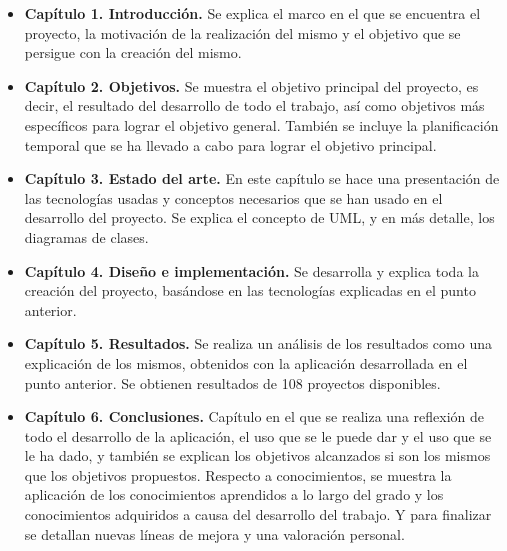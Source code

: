 \documentclass[a4paper, 12pt]{book}
\begin{document}
\begin{itemize}
  \item \textbf{Capítulo 1. Introducción.} Se explica el marco en el que se encuentra el proyecto, la motivación de la realización del mismo y el objetivo que se persigue con la creación del mismo.

  \item \textbf{Capítulo 2. Objetivos.} Se muestra el objetivo principal del proyecto, es decir, el resultado del desarrollo de todo el trabajo, así como objetivos más específicos para lograr el objetivo general. También se incluye la planificación temporal que se ha llevado a cabo para lograr el objetivo principal.

  \item \textbf{Capítulo 3. Estado del arte.} En este capítulo se hace una presentación de las tecnologías usadas y conceptos necesarios que se han usado en el desarrollo del proyecto. Se explica el concepto de UML, y en más detalle, los diagramas de clases.

  \item \textbf{Capítulo 4. Diseño e implementación.} Se desarrolla y explica toda la creación del proyecto, basándose en las tecnologías explicadas en el punto anterior.

  \item \textbf{Capítulo 5. Resultados.} Se realiza un análisis de los resultados como una explicación de los mismos, obtenidos con la aplicación desarrollada en el punto anterior. Se obtienen resultados de 108 proyectos disponibles.

  \item \textbf{Capítulo 6. Conclusiones.} Capítulo en el que se realiza una reflexión de todo el desarrollo de la aplicación, el uso que se le puede dar y el uso que se le ha dado, y también se explican los objetivos alcanzados si son los mismos que los objetivos propuestos. Respecto a conocimientos, se muestra la aplicación de los conocimientos aprendidos a lo largo del grado y los conocimientos adquiridos a causa del desarrollo del trabajo. Y para finalizar se detallan nuevas líneas de mejora y una valoración personal.

\end{itemize}



\end{document}
